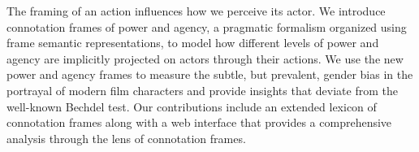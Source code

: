 The framing of an action influences how we perceive its actor. We introduce connotation frames of power and agency, a pragmatic formalism organized using frame semantic representations, to model how different levels of power and agency are implicitly projected on actors through their actions. We use the new power and agency frames to measure the subtle, but prevalent, gender bias in the portrayal of modern film characters and provide insights that deviate from the well-known Bechdel test. Our contributions include an extended lexicon of connotation frames along with a web interface that provides a comprehensive analysis through the lens of connotation frames.
